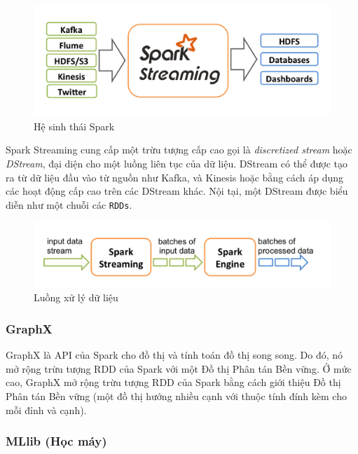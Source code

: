 \begin{figure}[H]
    \centering
    \includegraphics[width=0.8\linewidth]{Images/3.2-spark-eco.png}
    \vspace{1em}
    \caption{Hệ sinh thái Spark}
    \label{fig:eco}
\end{figure}

Spark Streaming cung cấp một trừu tượng cấp cao gọi là \textit{discretized stream} hoặc \textit{DStream}, đại diện cho một luồng liên tục của dữ liệu. DStream có thể được tạo ra từ dữ liệu đầu vào từ nguồn như Kafka, và Kinesis hoặc bằng cách áp dụng các hoạt động cấp cao trên các DStream khác. Nội tại, một DStream được biểu diễn như một chuỗi các \texttt{RDDs}.

\begin{figure}[H]
    \centering
    \includegraphics[width=1\linewidth]{Images/3.2-spark-flow.png}
    \vspace{1em}
    \caption{Luồng xử lý dữ liệu}
    \label{fig:flow}
\end{figure}

\subsubsection*{\textbf{GraphX}}

GraphX là API của Spark cho đồ thị và tính toán đồ thị song song. Do đó, nó mở rộng trừu tượng RDD của Spark với một Đồ thị Phân tán Bền vững. Ở mức cao, GraphX mở rộng trừu tượng RDD của Spark bằng cách giới thiệu Đồ thị Phân tán Bền vững (một đồ thị hướng nhiều cạnh với thuộc tính đính kèm cho mỗi đỉnh và cạnh).

\subsubsection*{\textbf{MLlib (Học máy)}}


